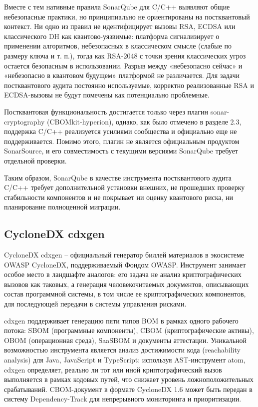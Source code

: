 \documentclass{itmo-vkr}
\begin{document}
	Вместе с тем нативные правила SonarQube для C/C++ выявляют общие небезопасные практики, но принципиально не ориентированы на постквантовый контекст. Ни одно из правил не идентифицирует вызовы RSA, ECDSA или классического DH как квантово-уязвимые: платформа сигнализирует о применении алгоритмов, небезопасных в классическом смысле (слабые по размеру ключа и т. п.), тогда как RSA-2048 с точки зрения классических угроз остается безопасным в использовании. Разрыв между «небезопасно сейчас» и «небезопасно в квантовом будущем» платформой не различается. Для задачи постквантового аудита постоянно используемые, корректно реализованные RSA и ECDSA-вызовы не будут помечены как потенциально проблемные.
	
	Постквантовая функциональность достигается только через плагин sonar-cryptography (CBOMkit-hyperion), однако, как было отмечено в разделе 2.3, поддержка C/C++ реализуется усилиями сообщества и официально еще не поддерживается. Помимо этого, плагин не является официальным продуктом SonarSource, и его совместимость с текущими версиями SonarQube требует отдельной проверки. 
	
	Таким образом, SonarQube в качестве инструмента постквантового аудита C/C++ требует дополнительной установки внешних, не прошедших проверку стабильности компонентов и не покрывает ни оценку квантового риска, ни планирование полноценной миграции.
	
	\subsection{CycloneDX cdxgen}
	
	CycloneDX cdxgen -- официальный генератор биллей материалов в экосистеме OWASP CycloneDX, поддерживаемый Фондом OWASP. Инструмент занимает особое место в ландшафте аналогов: его задача не анализ криптографических вызовов как таковых, а генерация человекочитаемых документов, описывающих состав программной системы, в том числе ее криптографических компонентов, для последующей передачи в системы управления рисками.
	
	cdxgen поддерживает генерацию пяти типов BOM в рамках одного рабочего потока: SBOM (программные компоненты), CBOM (криптографические активы), OBOM (операционная среда), SaaSBOM и документы аттестации. Уникальной возможностью инструмента является анализ достижимости кода (reachability analysis) для Java, JavaScript и TypeScript: используя AST-инструмент atom, cdxgen определяет, реально ли тот или иной криптографический вызов выполняется в рамках кодовых путей, что снижает уровень ложноположительных срабатываний. CBOM-документ в формате CycloneDX 1.6 может быть передан в систему Dependency-Track для непрерывного мониторинга и приоритизации.
	
\end{document}
